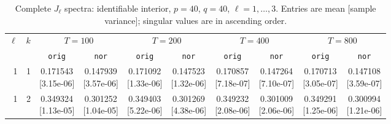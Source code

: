 \documentclass[12pt,letterpaper]{article}
\def\spacingset#1{\renewcommand{\baselinestretch}{#1}\small\normalsize}
\theoremstyle{plain}
\theoremstyle{definition}
\begin{document}
\begin{table}[p]
\begingroup
\spacingset{1.0}
\small\centering
\caption{Complete $J_\ell$ spectra: identifiable interior, $p=40$, $q=40$, $\ell=1,\ldots,3$. Entries are mean [sample variance]; singular values are in ascending order.}
\label{s23:lambda:alltab:spectra:p40q40interior:1-3}
\footnotesize
\setlength{\tabcolsep}{2.2pt}
\renewcommand{\arraystretch}{1.03}
\begin{adjustbox}{max width=\linewidth}
\begin{tabular}{@{}rr*{8}{c}@{}}
\toprule
$\ell$ & $k$ & \multicolumn{2}{c}{$T=100$} & \multicolumn{2}{c}{$T=200$} & \multicolumn{2}{c}{$T=400$} & \multicolumn{2}{c}{$T=800$}\\
\cmidrule(lr){3-4}\cmidrule(lr){5-6}\cmidrule(lr){7-8}\cmidrule(lr){9-10}
 &  & \texttt{orig} & \texttt{nor} & \texttt{orig} & \texttt{nor} & \texttt{orig} & \texttt{nor} & \texttt{orig} & \texttt{nor}\\
\midrule
1 & 1 & \shortstack{0.171543\\[-1pt]{\scriptsize[3.15e-06]}} & \shortstack{0.147939\\[-1pt]{\scriptsize[3.57e-06]}} & \shortstack{0.171092\\[-1pt]{\scriptsize[1.33e-06]}} & \shortstack{0.147523\\[-1pt]{\scriptsize[1.32e-06]}} & \shortstack{0.170857\\[-1pt]{\scriptsize[7.18e-07]}} & \shortstack{0.147264\\[-1pt]{\scriptsize[7.10e-07]}} & \shortstack{0.170713\\[-1pt]{\scriptsize[3.05e-07]}} & \shortstack{0.147108\\[-1pt]{\scriptsize[3.59e-07]}}\\
1 & 2 & \shortstack{0.349324\\[-1pt]{\scriptsize[1.13e-05]}} & \shortstack{0.301252\\[-1pt]{\scriptsize[1.04e-05]}} & \shortstack{0.349403\\[-1pt]{\scriptsize[5.22e-06]}} & \shortstack{0.301269\\[-1pt]{\scriptsize[4.38e-06]}} & \shortstack{0.349232\\[-1pt]{\scriptsize[2.08e-06]}} & \shortstack{0.301009\\[-1pt]{\scriptsize[2.06e-06]}} & \shortstack{0.349291\\[-1pt]{\scriptsize[1.25e-06]}} & \shortstack{0.300994\\[-1pt]{\scriptsize[1.21e-06]}}\\

\end{tabular}
\end{adjustbox}
\end{table}
\end{document}
